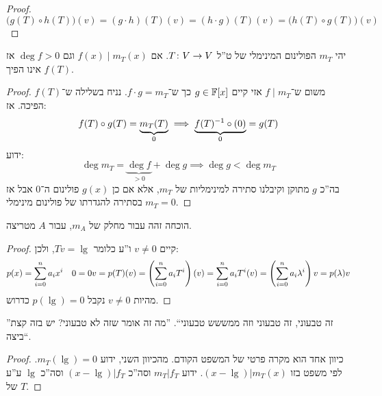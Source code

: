 \documentclass[name=רשימות אלגברה לינארית 2א]{../../../tex/classes/megasumPreamble}
\begin{document}
	\begin{proof}
		\[ \big(g(T) \circ h(T)\big)(v) = (g \cdot h)(T)(v) = (h \cdot g)(T)(v) = \big(h(T) \circ g(T) \big)(v) \]
	\end{proof}
	
	\begin{Lemma}
		יהי $m_T$ הפולינום המינימלי של ט''ל $T \colon V \to V$. אם $f(x) \mid m_T(x)$ וגם $\deg f > 0$ אז $f(T)$ אינו הפיך. 
	\end{Lemma}
	\begin{proof}
		משום ש־$f \mid m_T$ אזי קיים $g\in \mathbb{F}[x]$ כך ש־$f \cdot g = m_T$. נניח בשלילה ש־$f(T)$ הפיכה. אז: 
		\[ f(T) \circ g(T) = \underbrace{m_T(T)}_{0} \implies \underbrace{f(T)^{-1} \circ (0)}_{0} = g(T) \]
		ידוע: 
		\[ \deg m_T = \underbrace{\deg f}_{>0} + \deg g \implies \deg g< \deg m_T \]
		בה''כ $g$ מתוקן וקיבלנו סתירה למינימליות של $m_T$, אלא אם כן $g(x)$ פולינום ה־$0$ אבל אז $m_T = 0$ בסתירה להגדרתו של פולינום מינימלי. 
	\end{proof}
	הוכחה זהה עבור מחלק של $m_A$, עבור $A$ מטריצה. 
	\begin{proof}
		קיים $v \neq 0$ ו''ע כלומר $Tv = \lg$, ולכן: 
		\[ p(x) = \sum_{i = 0}^{n}a_ix^i \quad 0 = 0 v = p(T)(v) = \left ( \sum_{i = 0}^{n}a_iT^{i} \right )\left ( v \right ) = \sum_{i = 0}^{n}a_iT^{i}(v) = \left ( \sum_{i = 0}^{n}a_i\lambda^i \right )v = p(\lambda)v \] 
		מהיות $v \neq 0$ נקבל $p(\lg) = 0$ כדרוש. 
	\end{proof}
	''זה טבעוני, זה טבעוני וזה ממששש טבעוני``. ''מה זה אומר שזה לא טבעוני? יש בזה קצת ביצה``. 
	 \begin{proof}
		כיוון אחד הוא מקרה פרטי של המשפט הקודם. מהכיוון השני, ידוע $m_T(\lg) = 0$. לפי משפט בזו $(x - \lg) | m_T(x)$. ידוע $m_T | f_T$ וסה''כ $(x - \lg) | f_T$ וסה''כ $\lg$ ע''ע של $T$. 
	\end{proof}
	
\end{document}
